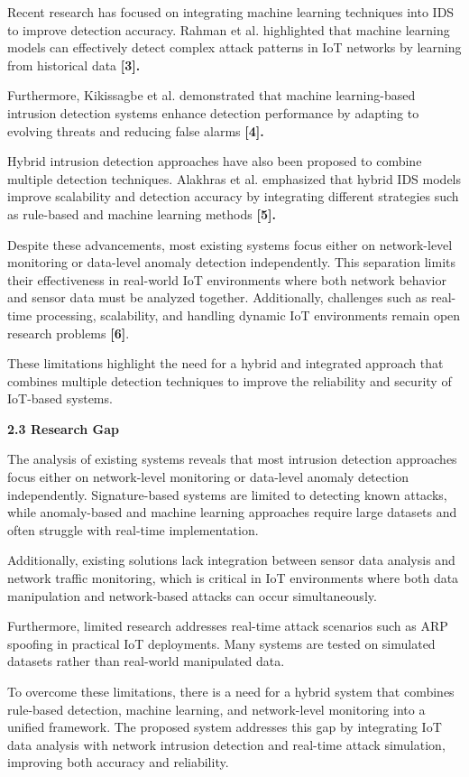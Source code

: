 Recent research has focused on integrating machine learning techniques
into IDS to improve detection accuracy. Rahman et al. highlighted that
machine learning models can effectively detect complex attack patterns
in IoT networks by learning from historical data \textbf{{[}3{]}.}

Furthermore, Kikissagbe et al. demonstrated that machine learning-based
intrusion detection systems enhance detection performance by adapting to
evolving threats and reducing false alarms \textbf{{[}4{]}.}

Hybrid intrusion detection approaches have also been proposed to combine
multiple detection techniques. Alakhras et al. emphasized that hybrid
IDS models improve scalability and detection accuracy by integrating
different strategies such as rule-based and machine learning methods
\textbf{{[}5{]}.}

Despite these advancements, most existing systems focus either on
network-level monitoring or data-level anomaly detection independently.
This separation limits their effectiveness in real-world IoT
environments where both network behavior and sensor data must be
analyzed together. Additionally, challenges such as real-time
processing, scalability, and handling dynamic IoT environments remain
open research problems \textbf{{[}6{]}}.

These limitations highlight the need for a hybrid and integrated
approach that combines multiple detection techniques to improve the
reliability and security of IoT-based systems.

\textbf{2.3 Research Gap}

The analysis of existing systems reveals that most intrusion detection
approaches focus either on network-level monitoring or data-level
anomaly detection independently. Signature-based systems are limited to
detecting known attacks, while anomaly-based and machine learning
approaches require large datasets and often struggle with real-time
implementation.

Additionally, existing solutions lack integration between sensor data
analysis and network traffic monitoring, which is critical in IoT
environments where both data manipulation and network-based attacks can
occur simultaneously.

Furthermore, limited research addresses real-time attack scenarios such
as ARP spoofing in practical IoT deployments. Many systems are tested on
simulated datasets rather than real-world manipulated data.

To overcome these limitations, there is a need for a hybrid system that
combines rule-based detection, machine learning, and network-level
monitoring into a unified framework. The proposed system addresses this
gap by integrating IoT data analysis with network intrusion detection
and real-time attack simulation, improving both accuracy and
reliability.

